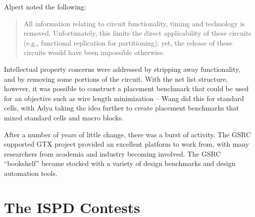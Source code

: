 \documentclass[sigconf]{acmart}
\begin{document}
Alpert noted the following:
\begin{quote}
All information relating to circuit functionality, timing and
technology is removed. Unfortunately, this limits the direct
applicability of these circuits (e.g., functional replication for
partitioning); yet, the release of these circuits would have been
impossible otherwise.%
\end{quote}

Intellectual property concerns were addressed by stripping
away functionality, and by removing some portions of the circuit.
With the net list structure, however, it was possible to construct
a placement benchmark that could be used for an objective such
as wire length minimization -- Wang\cite{Wang000260} did this
for standard cells, with Adya\cite{Adya020012} taking the idea
further to create placement benchmarks that mixed
standard cells and macro blocks.


After a number of years of little change, there was a burst of
activity.  The GSRC supported GTX project\cite{Caldwell000693}
provided an excellent platform to work from, with many researchers
from academia and industry becoming involved.  The GSRC
``bookshelf\cite{bookshelf}'' became stocked with a variety
of design benchmarks and design automation tools.













\section{The ISPD Contests}
\end{document}
